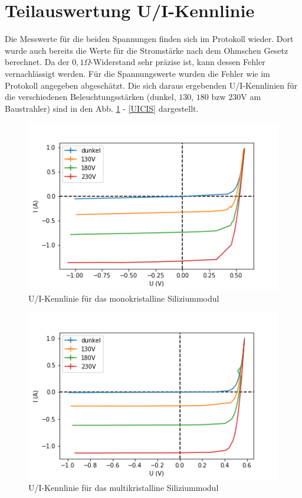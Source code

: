 

\section{Teilauswertung U/I-Kennlinie}
Die Messwerte für die beiden Spannungen finden sich im Protokoll wieder. Dort wurde auch bereits die Werte für die Stromstärke nach dem 
Ohmschen Gesetz berechnet. Da der $0,1 \Omega$-Widerstand sehr präzise ist, kann dessen Fehler vernachlässigt werden. Für die Spannungswerte
wurden die Fehler wie im Protokoll angegeben abgeschätzt. Die sich daraus ergebenden U/I-Kennlinien für die verschiedenen Beleuchtungsstärken
(dunkel, $130$, $180$ bzw $230$V am Baustrahler) sind in den Abb. \ref{bild:UIMono} - \ref{UICIS} dargestellt.

\begin{figure}[h]
    \centering
    \includegraphics[scale=0.75]{Bilder/UIMono.png}
    \caption{U/I-Kennlinie für das monokristalline Siliziummodul}
    \label{bild:UIMono}
\end{figure}

\begin{figure}[h]
    \centering
    \includegraphics[scale=0.75]{Bilder/UIMulti.png}
    \caption{U/I-Kennlinie für das multikristalline Siliziummodul}
    \label{bild:UIMulti}
\end{figure}

